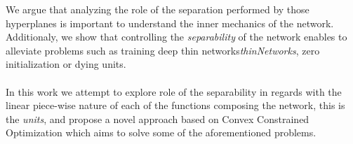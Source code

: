 We argue that analyzing the role of the separation performed by those hyperplanes is important to understand the inner mechanics of the network. Additionaly, we show that controlling the \emph{separability} of the network enables to alleviate problems such as training deep thin networks\emph{thinNetworks}, zero initialization \cite{FixUP} or dying units\cite{LeakyReLU}.
\\\\ 

In this work we attempt to explore role of the separability in regards with the linear piece-wise nature of each of the functions composing the network, this is the \emph{units}, and propose a novel approach based on Convex Constrained Optimization which aims to solve some of the aforementioned problems.

